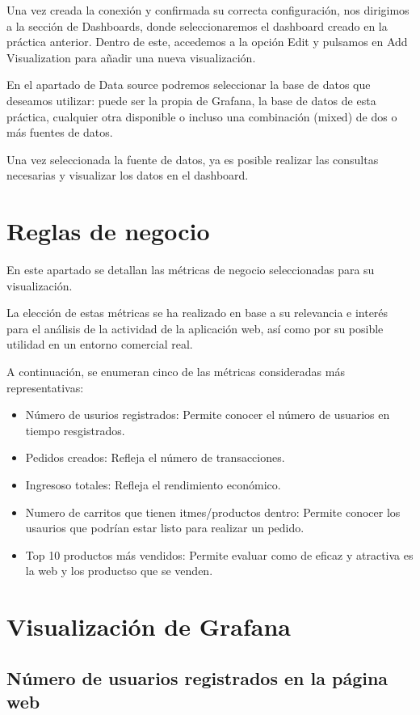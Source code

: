 \documentclass[10pt]{book}
\begin{document}
Una vez creada la conexión y confirmada su correcta configuración, nos dirigimos a la sección de Dashboards, donde seleccionaremos el dashboard creado en la práctica anterior. Dentro de este, accedemos a la opción Edit y pulsamos en Add Visualization para añadir una nueva visualización.

En el apartado de Data source podremos seleccionar la base de datos que deseamos utilizar: puede ser la propia de Grafana, la base de datos de esta práctica, cualquier otra disponible o incluso una combinación (mixed) de dos o más fuentes de datos.

Una vez seleccionada la fuente de datos, ya es posible realizar las consultas necesarias y visualizar los datos en el dashboard.
\newpage
\section{Reglas de negocio} \cite{metricas_boske}
En este apartado se detallan las métricas de negocio seleccionadas para su visualización.

La elección de estas métricas se ha realizado en base a su relevancia e interés para el análisis de la actividad de la aplicación web, así como por su posible utilidad en un entorno comercial real.

A continuación, se enumeran cinco de las métricas consideradas más representativas:
\begin{itemize}
    \item Número de usurios registrados: Permite conocer el número de usuarios en tiempo resgistrados.
    \item Pedidos creados: Refleja el número de transacciones. 
    \item Ingresoso totales: Refleja el rendimiento económico.
    \item Numero de carritos que tienen itmes/productos dentro: Permite conocer los usaurios que podrían estar listo para realizar un pedido.
    \item Top 10 productos más vendidos: Permite evaluar como de eficaz y atractiva es la web y los productso que se venden.
\end{itemize}

\section{Visualización de Grafana}\label{sec:visualizacion}
\subsection*{Número de usuarios registrados en la página web}
\end{document}
